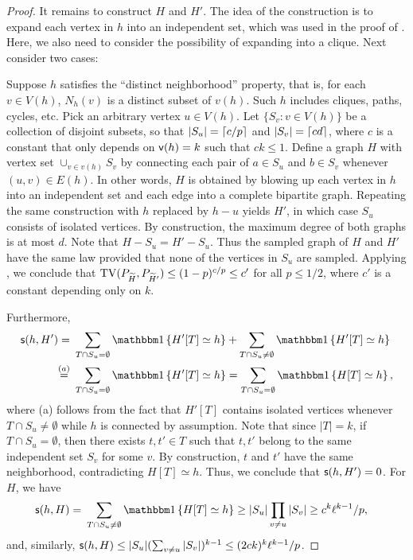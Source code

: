 \begin{proof}
It remains to construct $H$ and $H'$. The idea of the construction is to expand each vertex in $h$ into an independent set, which was used in the proof of \cite[Lemma 5]{Erdos1979}. Here, we also need to consider the possibility of expanding into a clique. Next consider two cases:

Suppose $h$ satisfies the ``distinct neighborhood'' property, that is, for each $v \in V(h)$, $N_h(v)$ is a distinct subset of $v(h)$. 
Such $h$ includes cliques, paths, cycles, etc.
Pick an arbitrary vertex $u\in V(h)$. 
Let $\{S_v: v \in V(h)\}$ be a collection of disjoint subsets, so that $|S_u| = {\left\lceil { c/p} \right \rceil}$ and $|S_v| = {\left\lceil {c d} \right \rceil}$, where
$c$ is a constant that only depends on ${\mathsf{v}}(h)=k$ such that $c k \leq 1$. 
Define a graph $H$ with vertex set $\cup_{v\in v(h)} S_v$ by connecting each pair of $a \in S_u$ and $b\in S_v$ whenever $(u,v) \in E(h)$. In other words, $H$ is obtained by blowing up each vertex in $h$ into an independent set and each edge into a complete bipartite graph.
Repeating the same construction with $h$ replaced by $h-u$ yields $H'$, in which case $S_u$ consists of isolated vertices.
By construction, the maximum degree of both graphs is at most $d$.
Note that $H-S_u = H'-S_u$. 
Thus the sampled graph of $H$ and $H'$ have the same law provided that none of the vertices in $S_u$ are sampled. 
Applying , we conclude that ${\rm TV}(P_{{\widetilde{H}}}, P_{{\widetilde{H}}'}) \leq (1-p)^{c/p} \leq c'$ for all $p \leq 1/2$, where $c'$ is a constant depending only on $k$. 

Furthermore, 
\begin{align*}
\s(h,H')
= & ~ \sum_{T \cap S_u = \emptyset}\indc{H'[T] \simeq h}  + \sum_{T \cap S_u \neq \emptyset}\indc{H'[T] \simeq h}  \\
\overset{(a)}{=} & ~ \sum_{T \cap S_u = \emptyset}\indc{H'[T] \simeq h}   = \sum_{T \cap S_u = \emptyset}\indc{H[T] \simeq h},
\end{align*}
where (a) follows from the fact that $H'[T]$ contains isolated vertices whenever $T \cap S_u \neq \emptyset$ while $h$ is connected by assumption.
Note that since $|T|=k$, if $T \cap S_u = \emptyset$, then there exists $t,t' \in T$ such that $t,t'$ belong to the same independent set $S_v$ for some $v$. By construction, $t$ and $t'$ have the same neighborhood, contradicting $H[T]\simeq h$. 
Thus, we conclude that $\mathsf{s}(h,H')=0$. For $H$, we have
\begin{align*}
\s(h,H)
= & ~ \sum_{T \cap S_u \neq \emptyset}\indc{H[T] \simeq h}  
\geq |S_u| \prod_{v \neq u} |S_v| \geq c^k \ell^{k-1}/p,
\end{align*}
and, similarly, $\mathsf{s}(h,H) \leq |S_u| (\sum_{v \neq u} |S_v|)^{k-1} \leq (2ck)^k \ell^{k-1}/p$. 


\end{proof}
